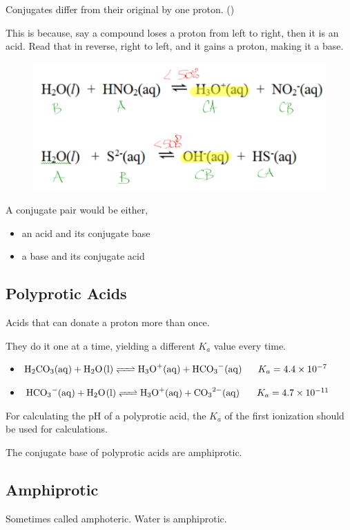 \documentclass[a4paper,12pt]{article}
\begin{document}
Conjugates differ from their original by one proton. ()

This is because, say a compound loses a proton from left to right, then it is an acid. Read that in reverse, right to left, and it gains a proton, making it a base.
\begin{figure}[H]
    \includegraphics[width=\textwidth]{conjugate}
\end{figure}

A conjugate pair would be either,
\begin{itemize}
    \item{an acid and its conjugate base}
    \item{a base and its conjugate acid}
\end{itemize}

\subsection{Polyprotic Acids}
Acids that can donate a proton more than once.

They do it one at a time, yielding a different $K_a$ value every time.

\begin{itemize}
    \item{$\ce{H2CO3(aq) + H2O(l) <=> H3O+(aq) + HCO3-(aq)} \;\;\;\;\;\; K_a = \num{4.4e-7}$}
    \item{$\ce{HCO3-(aq) + H2O(l) <=> H3O+(aq) + CO3^{2-}(aq)} \,\;\;\;\;\;\; K_a = \num{4.7e-11}$}
\end{itemize}

For calculating the pH of a polyprotic acid, the $K_a$ of the first ionization should be used for calculations.

The conjugate base of polyprotic acids are amphiprotic.

\subsection{Amphiprotic}
Sometimes called amphoteric. Water is amphiprotic.
\end{document}
